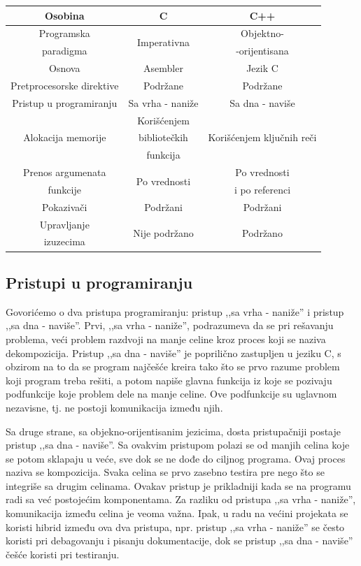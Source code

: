 \documentclass[a4paper]{article}
\begin{document}
{\begin{tabular}{|c|c|c|}
\hline
Osobina & C & C++ \\
\hline
Programska & \multirow{2}{5.5em}{Imperativna} & Objektno- \\
paradigma & & -orijentisana\\
\hline
Osnova & Asembler & Jezik C \\
\hline
Pretprocesorske direktive & Podržane & Podržane\\
\hline
Pristup u programiranju & Sa vrha - naniže & Sa dna - naviše\\
\hline
\multirow{3}{4em}{Alokacija memorije} & Korišćenjem  & \multirow{3}{5.5em}{Korišćenjem ključnih reči}\\
& bibliotečkih & \\
& funkcija &\\
\hline
Prenos argumenata & \multirow{2}{5.5em}{Po vrednosti} & Po vrednosti\\
funkcije & & i po referenci\\
\hline
Pokazivači & Podržani & Podržani\\
\hline
Upravljanje & \multirow{2}{6.2em}{Nije podržano} & \multirow{2}{4em}{Podržano} \\
izuzecima & &\\
\hline
\end{tabular}

\subsection{Pristupi u programiranju}

Govorićemo o dva pristupa programiranju: pristup ,,sa vrha - naniže'' i pristup ,,sa dna - naviše''. Prvi, ,,sa vrha - naniže'', podrazumeva da se pri rešavanju problema, veći problem razdvoji na manje celine kroz proces koji se naziva dekompozicija. Pristup ,,sa dna - naviše'' je poprilično zastupljen u jeziku C, s obzirom na to da se program najčešće kreira tako što se prvo razume problem koji program treba rešiti, a potom napiše glavna funkcija iz koje se pozivaju podfunkcije koje problem dele na manje celine. Ove podfunkcije su uglavnom nezavisne, tj. ne postoji komunikacija između njih.

Sa druge strane, sa objekno-orijentisanim jezicima, dosta pristupačniji postaje pristup ,,sa dna - naviše''. Sa ovakvim pristupom polazi se od manjih celina koje se potom sklapaju u veće, sve dok se ne dođe do ciljnog programa. Ovaj proces naziva se kompozicija. Svaka celina se prvo zasebno testira pre nego što se integriše sa drugim celinama. Ovakav pristup je prikladniji kada se na programu radi sa već postojećim komponentama. Za razliku od pristupa ,,sa vrha - naniže'', komunikacija između celina je veoma važna. Ipak, u radu na većini projekata se koristi hibrid između ova dva pristupa, npr. pristup ,,sa vrha - naniže'' se često koristi pri debagovanju i pisanju dokumentacije, dok se pristup ,,sa dna - naviše'' češće koristi pri testiranju.

}
\end{document}
